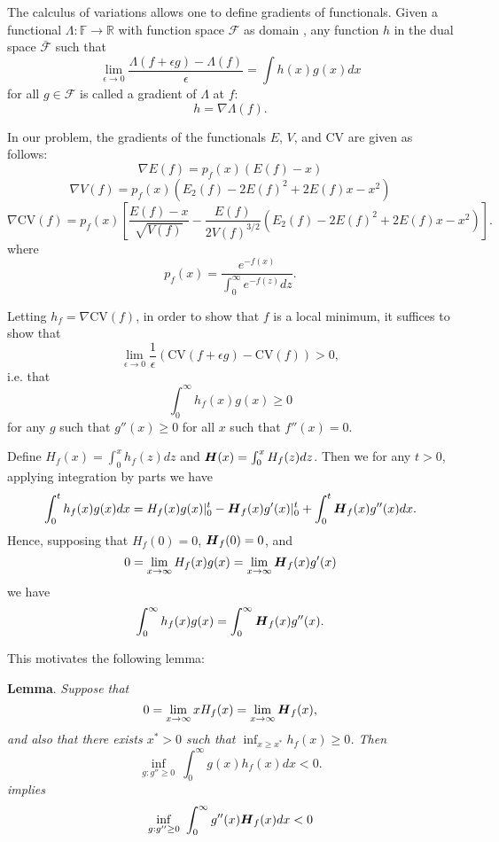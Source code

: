 \documentclass[11pt]{article}
\begin{document}
The calculus of variations allows one to define gradients of functionals.
Given a functional $\Lambda : \mathbb{F} \to \mathbb{R}$ with function space $\mathcal{F}$ as domain , 
any function $h$ in the dual space $\bar{\mathcal{F}}$
 such that
\[
\lim_{\epsilon \to 0} \frac{\Lambda(f + \epsilon g) - \Lambda(f)}{\epsilon} = \int h(x) g(x) dx
\]
for all $g \in \mathcal{F}$
is called a gradient of $\Lambda$ at $f$:
\[h = \nabla \Lambda(f) .\]

In our problem, the gradients of the functionals $E$, $V$, and $\text{CV}$ are given as follows:
\[
\nabla E(f) = p_f(x) (E(f) - x)
\]
\[
\nabla V(f) = p_f(x) (E_2(f) - 2E(f)^2 + 2 E(f) x - x^2)
\]
\[
\nabla \text{CV}(f) = p_f(x) \left[
\frac{E(f) - x}{\sqrt{V(f)}} - \frac{E(f)}{2V(f)^{3/2}}\left(
E_2(f) - 2E(f)^2 + 2 E(f) x - x^2
\right)
\right].
\]
where
\[
p_f(x) = \frac{e^{-f(x)}}{\int_0^\infty e^{-f(z)} dz}.
\]

Letting $h_f = \nabla \text{CV}(f)$, in order to show that $f$ is a local minimum, it suffices to show that
\[
\lim_{\epsilon \to 0} \frac{1}{\epsilon}(\text{CV}(f + \epsilon g) - \text{CV}(f)) > 0,
\]
i.e. that
\[
\int_0^\infty h_f(x) g(x) \geq 0
\]
for any $g$ such that $g''(x) \geq 0$ for all $x$ such that $f''(x) = 0$.

Define $H_f(x) = \int_0^x h_f(z) dz$ and $\boldsymbol{H} (x) = \int_0^x H_f(z) dz$.
Then we for any $t > 0$, applying integration by parts we have
\[
\int_0^t h_f(x) g(x) dx = H_f(x) g(x) |_0^t - \boldsymbol{H}_f (x) g'(x)|_0^t + \int_0^t \boldsymbol{H}_f(x) g''(x) dx.
\]
Hence, supposing that $H_f(0) = 0$, $\boldsymbol{H}_f(0) = 0$, and
\[
0 = \lim_{x \to \infty} H_f(x) g(x) = \lim_{x \to \infty} \boldsymbol{H}_f (x) g'(x)
\]
we have
\[
\int_0^\infty h_f(x) g(x) = \int_0^\infty \boldsymbol{H}_f(x) g''(x).
\]

This motivates the following lemma:

\noindent\textbf{Lemma}. \emph{
Suppose that 
\[0 = \lim_{x \to \infty} x H_f(x) = \lim_{x \to \infty} \boldsymbol{H}_f(x),\]
and also that there exists $x^* > 0$ such that $\inf_{x \geq x^*} h_f(x) \geq 0$.
Then
\[
\inf_{g: g'' \geq 0}\ \int_0^\infty g(x) h_f(x) dx < 0.
\]
implies
\[
\inf_{g: g'' \geq 0}\ \int_0^\infty g''(x) \boldsymbol{H}_f(x) dx < 0
\]
}
\end{document}
